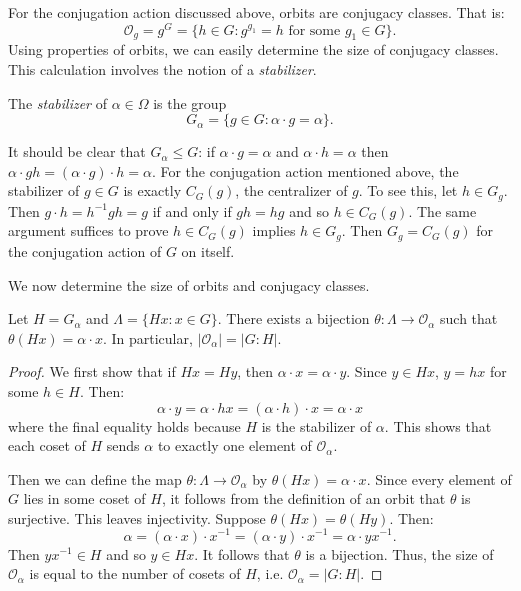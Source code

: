 \documentclass[main.tex]{subfiles}
\begin{document}
For the conjugation action discussed above, orbits are conjugacy classes. That is:
$$\mathcal{O}_g = g^G = \{h \in G : g^{g_1} = h \text{ for some } g_1 \in G \} \text{.}$$
 Using properties of orbits, we can easily determine the size of conjugacy classes. This calculation involves the notion of a \emph{stabilizer}.

\hss

\begin{definition}
The \emph{stabilizer} of $\alpha \in \Omega$ is the group 
$$G_\alpha = \{g \in G : \alpha \cdot g = \alpha \} \text{.}$$
\end{definition}

\hss

It should be clear that $G_\alpha \le G$: if $\alpha \cdot g = \alpha$ and $\alpha \cdot h = \alpha$ then $\alpha \cdot gh = (\alpha \cdot g) \cdot h = \alpha$. For the conjugation action mentioned above, the stabilizer of $g \in G$ is exactly $C_G(g)$, the centralizer of $g$. To see this, let $h \in G_g$. Then $g \cdot h = h^{-1} g h = g$ if and only if $gh = hg$ and so $h \in C_G(g)$. The same argument suffices to prove $h \in C_G(g)$ implies $h \in G_g$. Then $G_g = C_G(g)$ for the conjugation action of $G$ on itself.

We now determine the size of orbits and conjugacy classes.

\begin{theorem}
Let $H = G_\alpha$ and $\Lambda = \{H x : x \in G\}$. There exists a bijection $\theta : \Lambda \to \mathcal{O}_\alpha$ such that $\theta(H x) = \alpha \cdot x$. In particular,
$|\mathcal{O}_\alpha| = |G : H|$.
\end{theorem}

\begin{proof}
We first show that if $H x = H y$, then $\alpha \cdot x = \alpha \cdot y$. Since $y \in Hx$, $y = h x$ for some $h \in H$. Then:
$$\alpha \cdot y = \alpha \cdot h x = (\alpha \cdot h) \cdot x = \alpha \cdot x$$
where the final equality holds because $H$ is the stabilizer of $\alpha$. This shows that each coset of $H$ sends $\alpha$ to exactly one element of $\mathcal{O}_\alpha$.

Then we can define the map $\theta: \Lambda \to \mathcal{O}_\alpha$ by $\theta(H x) = \alpha \cdot x$. Since every element of $G$ lies in some coset of $H$, it follows from the definition of an orbit that $\theta$ is surjective. This leaves injectivity. Suppose $\theta(H x) = \theta(H y)$. Then:
$$ \alpha = (\alpha \cdot x ) \cdot x^{-1} = (\alpha \cdot y) \cdot x^{-1} = \alpha \cdot y x^{-1} \text{.}$$
Then $y x^{-1} \in H$ and so $y \in Hx$. It follows that $\theta$ is a bijection. Thus, the size of $\mathcal{O}_\alpha$ is equal to the number of cosets of $H$, i.e. $\mathcal{O}_\alpha = |G : H|$.

\end{proof}
\end{document}
